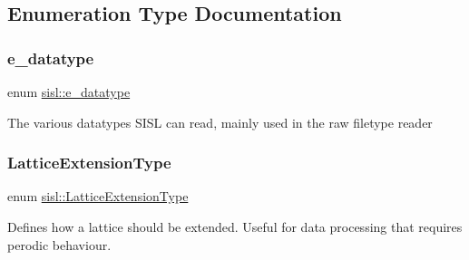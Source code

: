\subsection{Enumeration Type Documentation}
\mbox{\label{namespacesisl_acb05df69c6b8f6d31074a5f4cec4baeb}} 
\subsubsection{\texorpdfstring{e\+\_\+datatype}{e\_datatype}}
{\footnotesize\ttfamily enum \hyperlink{namespacesisl_acb05df69c6b8f6d31074a5f4cec4baeb}{sisl\+::e\+\_\+datatype}}

The various datatypes S\+I\+SL can read, mainly used in the raw filetype reader \mbox{\label{namespacesisl_aaf1f41d23ed37dacaa4c9f1bb6d3324f}} 
\subsubsection{\texorpdfstring{Lattice\+Extension\+Type}{LatticeExtensionType}}
{\footnotesize\ttfamily enum \hyperlink{namespacesisl_aaf1f41d23ed37dacaa4c9f1bb6d3324f}{sisl\+::\+Lattice\+Extension\+Type}}



Defines how a lattice should be extended. Useful for data processing that requires perodic behaviour. 

